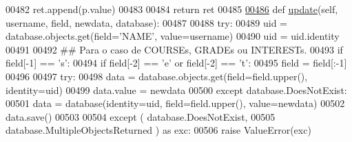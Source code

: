 \begin{DoxyCode}
00482             ret.append(p.value)
00483 
00484         \textcolor{keywordflow}{return} ret
00485 
\hypertarget{ProfileUnit_8py_source_l00486}{}\hyperlink{classProfile_1_1ProfileUnit_1_1PersProfile_a8c6dec48c3beb92e0250261f1dfb81df}{00486}     \textcolor{keyword}{def }\hyperlink{classProfile_1_1ProfileUnit_1_1PersProfile_a8c6dec48c3beb92e0250261f1dfb81df}{update}(self, username, field, newdata, database):
00487         
00488         \textcolor{keywordflow}{try}:
00489             uid = database.objects.get(field=\textcolor{stringliteral}{'NAME'}, value=username)
00490             uid = uid.identity
00491 
00492             \textcolor{comment}{## Para o caso de COURSEs, GRADEs ou INTERESTs.}
00493             \textcolor{keywordflow}{if} field[-1] == \textcolor{stringliteral}{'s'}:
00494                 \textcolor{keywordflow}{if} field[-2] == \textcolor{stringliteral}{'e'} \textcolor{keywordflow}{or} field[-2] == \textcolor{stringliteral}{'t'}:
00495                     field = field[:-1]
00496                 
00497             \textcolor{keywordflow}{try}:
00498                 data = database.objects.get(field=field.upper(), identity=uid)
00499                 data.value = newdata
00500             \textcolor{keywordflow}{except} database.DoesNotExist:
00501                 data = database(identity=uid, field=field.upper(), value=newdata)
00502             data.save()
00503 
00504         \textcolor{keywordflow}{except} ( database.DoesNotExist, 
00505                  database.MultipleObjectsReturned ) \textcolor{keyword}{as} exc:
00506             \textcolor{keywordflow}{raise} ValueError(exc)
\end{DoxyCode}

